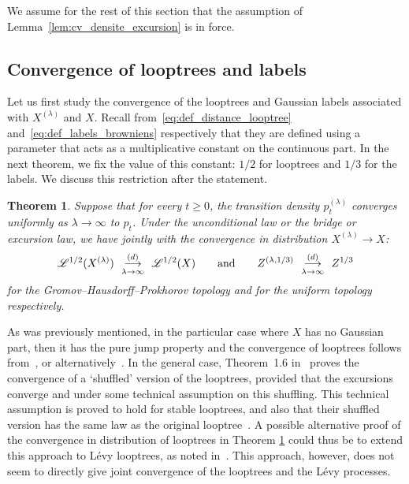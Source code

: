 \documentclass[british, a4paper,11pt]{article}
\numberwithin{equation}{section}
\newtheorem{thm}{\bfseries \upshape Theorem}[section]
\theoremstyle{definition}
\newcommand{\Loop}{\mathscr{L}}
\newcommand{\cvloi}[1][n]{\enskip\mathop{\longrightarrow}^{(d)}_{#1 \to \infty}\enskip}
\begin{document}
We assume for the rest of this section that the assumption of Lemma~\ref{lem:cv_densite_excursion} is in force.

\subsection{Convergence of looptrees and labels}
\label{ssec:convergence_looptree_Levy}

Let us first study the convergence of the looptrees and Gaussian labels associated with $X^{(\lambda)}$ and $X$.
Recall from~\eqref{eq:def_distance_looptree} and~\eqref{eq:def_labels_browniens} respectively that they are defined using a parameter that
acts as a multiplicative constant on the continuous part.
In the next theorem, we fix the value of this constant: $1/2$ for looptrees and $1/3$ for the labels.
We discuss this restriction after the statement.


\begin{thm}\label{thm:convergence_Levy_looptree_label}
Suppose that for every $t \geq 0$, the transition density $p^{(\lambda)}_t$ converges uniformly as $\lambda \to \infty$ to $p_t$.
Under the unconditional law or the bridge or excursion law, we have jointly with the convergence in distribution $X^{(\lambda)} \to X$:
\[\Loop^{1/2}(X^{(\lambda)}) \cvloi[\lambda] \Loop^{1/2}(X)
\qquad\text{and}\qquad
Z^{(\lambda,1/3)} \cvloi[\lambda] Z^{1/3}\]
for the Gromov--Hausdorff--Prokhorov topology and
for the uniform topology respectively.
\end{thm}

As was previously mentioned, in the particular case where $X$ has no Gaussian part, then it has the pure jump property and the convergence of looptrees follows from~\cite[Section 4]{Mar24}, or alternatively~\cite[Theorem~1.4]{Kha22}. 
In the general case, Theorem~1.6 in~\cite{Kha22} proves the convergence of a `shuffled' version of the looptrees, provided that the excursions converge and under some technical assumption on this shuffling. This technical assumption is proved to hold for stable looptrees, and also that their shuffled version has the same law as the original looptree~\cite[Theorem~6.6]{Kha22}.
A possible alternative proof of the convergence in distribution of looptrees in Theorem \ref{thm:convergence_Levy_looptree_label} could thus be to extend this approach to L\'evy looptrees, as noted in~\cite[Remark 6.8]{Kha22}. This approach, however, does not seem to
directly give joint convergence of the looptrees and the L\'evy processes.
\end{document}
